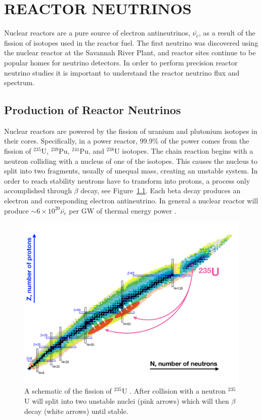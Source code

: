 \chapter{\uppercase{Reactor Neutrinos}}

Nuclear reactors are a pure source of electron antineutrinos, $\bar{\nu_e}$, as a result of the fission of isotopes used in the reactor fuel. The first neutrino was discovered using the nuclear reactor at the Savannah River Plant, and reactor sites continue to be popular homes for neutrino detectors. 
In order to perform precision reactor neutrino studies it is important to understand the reactor neutrino flux and spectrum.

\section{Production of Reactor Neutrinos}

Nuclear reactors are powered by the fission of uranium and plutonium isotopes in their cores. 
Specifically, in a power reactor, 99.9\% of the power comes from the fission of $^{235}$U, $^{239}$Pu, $^{241}$Pu, and $^{238}$U isotopes. 
The chain reaction begins with a neutron colliding with a nucleus of one of the isotopes. 
This causes the nucleus to split into two fragments, usually of unequal mass, creating an unstable system.
In order to reach stability neutrons have to transform into protons, a process only accomplished through $\beta$ decay, see Figure~\ref{fig:nucchart}.
Each beta decay produces an electron and corresponding electron antineutrino. 
In general a nuclear reactor will produce $\sim 6 \times 10^{20} \bar{\nu_e}$ per GW of thermal energy power \cite{HayesVogel}.

\begin{figure}[h]
	\centering
	\includegraphics[width=0.7\linewidth]{tex/3-reactorneutrinos-images/NuclideChart_U235}
	\caption[Fission of $^{235}$U.]{A schematic of the fission of $^{235}$U \cite{NucChart}. After collision with a neutron $^{235}$U will split into two unstable nuclei (pink arrows) which will then $\beta$ decay (white arrows) until stable.}
	\label{fig:nucchart}
\end{figure}


